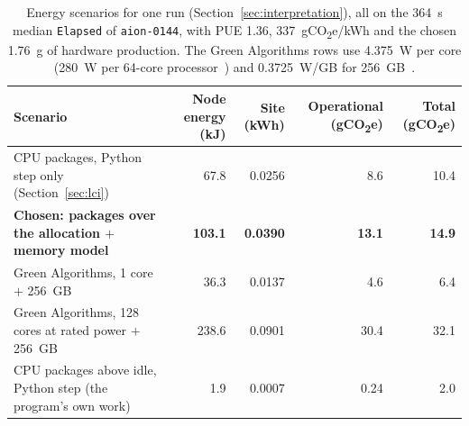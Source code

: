\documentclass[conference,a4paper]{IEEEtran}
\begin{document}
\begin{table}[!t]
\caption{Energy scenarios for one run (Section~\ref{sec:interpretation}), all on
the 364~s median \texttt{Elapsed} of \texttt{aion-0144}, with PUE 1.36,
337~gCO\textsubscript{2}e/kWh and the chosen 1.76~g of hardware production.
The Green Algorithms rows use 4.375~W per core (280~W per 64-core
processor~\cite{ulhpcaion}) and 0.3725~W/GB for 256~GB~\cite{lannelongue2021}.}
\label{tab:scenarios}
\centering\footnotesize\setlength{\tabcolsep}{4pt}
\begin{tabular}{@{}lrrrr@{}}
\toprule
Scenario & Node energy (kJ) & Site (kWh) & Operational (gCO\textsubscript{2}e) & Total (gCO\textsubscript{2}e) \\
\midrule
CPU packages, Python step only (Section~\ref{sec:lci}) & 67.8 & 0.0256 & 8.6 & 10.4 \\
\textbf{Chosen: packages over the allocation $+$ memory model} & \textbf{103.1} & \textbf{0.0390} & \textbf{13.1} & \textbf{14.9} \\
Green Algorithms, 1 core $+$ 256~GB & 36.3 & 0.0137 & 4.6 & 6.4 \\
Green Algorithms, 128 cores at rated power $+$ 256~GB & 238.6 & 0.0901 & 30.4 & 32.1 \\
\midrule
CPU packages above idle, Python step (the program's own work) & 1.9 & 0.0007 & 0.24 & 2.0 \\
\bottomrule
\end{tabular}
\end{table}
\end{document}
